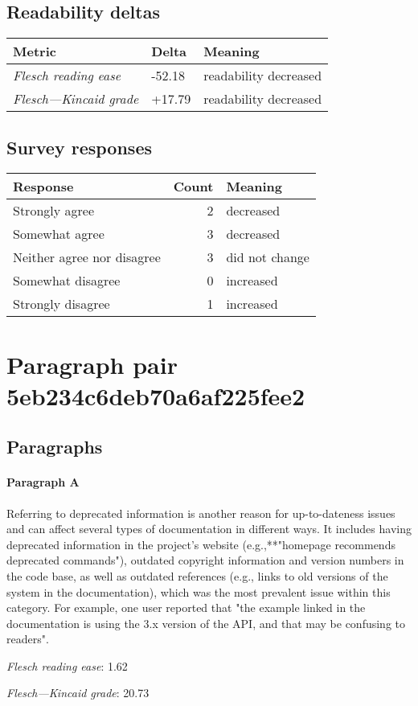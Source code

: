 \subsection{Readability deltas}

\begin{tabular}{lll}
\toprule
               \textbf{Metric} & \textbf{Delta} &       \textbf{Meaning} \\
\midrule
    \emph{Flesch reading ease} &         -52.18 &  readability decreased \\
 \emph{Flesch---Kincaid grade} &         +17.79 &  readability decreased \\
\bottomrule
\end{tabular}

\subsection{Survey responses}
\begin{tabular}{lrl}
\toprule
          \textbf{Response} &  \textbf{Count} & \textbf{Meaning} \\
\midrule
             Strongly agree &               2 &        decreased \\
             Somewhat agree &               3 &        decreased \\
 Neither agree nor disagree &               3 &   did not change \\
          Somewhat disagree &               0 &        increased \\
          Strongly disagree &               1 &        increased \\
\bottomrule
\end{tabular}

\section{Paragraph pair 5eb234c6deb70a6af225fee2}
\subsection{Paragraphs}
\paragraph{Paragraph A}
Referring to deprecated information is another reason for up-to-dateness issues and can affect several types of documentation in different ways. It includes having deprecated information in the project's website (e.g.,**"homepage recommends deprecated commands"), outdated copyright information and version numbers in the code base, as well as outdated references (e.g., links to old versions of the system in the documentation), which was the most prevalent issue within this category. For example, one user reported that "the example linked in the documentation is using the 3.x version of the API, and that may be confusing to readers".\par\medskip
\emph{Flesch reading ease}: 1.62\par
\emph{Flesch---Kincaid grade}: 20.73

